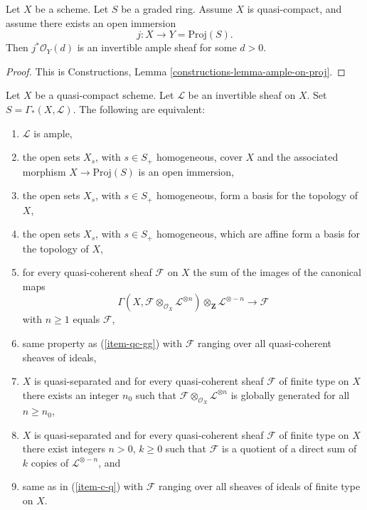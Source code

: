\begin{lemma}
\label{lemma-open-in-proj-ample}
Let $X$ be a scheme.
Let $S$ be a graded ring. Assume $X$ is quasi-compact,
and assume there exists an open immersion
$$
j : X \longrightarrow Y = \text{Proj}(S).
$$
Then $j^*\mathcal{O}_Y(d)$ is an invertible ample sheaf
for some $d > 0$.
\end{lemma}

\begin{proof}
This is Constructions, Lemma \ref{constructions-lemma-ample-on-proj}.
\end{proof}

\begin{proposition}
\label{proposition-characterize-ample}
Let $X$ be a quasi-compact scheme.
Let $\mathcal{L}$ be an invertible sheaf on $X$.
Set $S = \Gamma_*(X, \mathcal{L})$.
The following are equivalent:
\begin{enumerate}
\item
\label{item-ample}
$\mathcal{L}$ is ample,
\item
\label{item-immersion}
the open sets $X_s$, with $s \in S_{+}$ homogeneous,
cover $X$ and the associated morphism $X \to \text{Proj}(S)$
is an open immersion,
\item
\label{item-s-basis}
the open sets $X_s$, with $s \in S_{+}$ homogeneous,
form a basis for the topology of $X$,
\item
\label{item-s-affine-basis}
the open sets $X_s$, with $s \in S_{+}$ homogeneous,
which are affine form a basis for the topology of $X$,
\item
\label{item-qc-gg}
for every quasi-coherent sheaf $\mathcal{F}$ on $X$
the sum of the images of the canonical maps
$$
\Gamma(X, \mathcal{F} \otimes_{\mathcal{O}_X} \mathcal{L}^{\otimes n})
\otimes_{\mathbf{Z}} \mathcal{L}^{\otimes -n}
\longrightarrow
\mathcal{F}
$$
with $n \geq 1$ equals $\mathcal{F}$,
\item
\label{item-qc-i-gg}
same property as (\ref{item-qc-gg}) with $\mathcal{F}$
ranging over all quasi-coherent sheaves of ideals,
\item
\label{item-c-gg}
$X$ is quasi-separated and
for every quasi-coherent sheaf $\mathcal{F}$ of finite type on $X$
there exists an integer $n_0$ such that
$\mathcal{F} \otimes_{\mathcal{O}_X} \mathcal{L}^{\otimes n}$
is globally generated for all $n \geq n_0$,
\item
\label{item-c-q}
$X$ is quasi-separated and
for every quasi-coherent sheaf $\mathcal{F}$ of finite type on $X$
there exist integers $n > 0$, $k \geq 0$ such that
$\mathcal{F}$ is a quotient of a direct sum of $k$ copies of
$\mathcal{L}^{\otimes - n}$, and
\item
\label{item-c-i-q}
same as in (\ref{item-c-q}) with $\mathcal{F}$ ranging over all
sheaves of ideals of finite type on $X$.
\end{enumerate}
\end{proposition}

